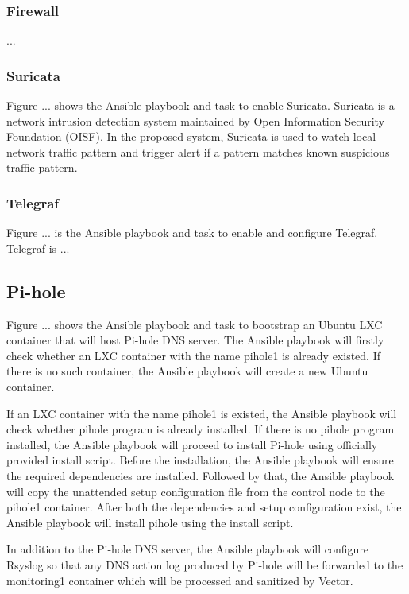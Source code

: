 \documentclass[../index.tex]{subfiles}
\begin{document}
\subsubsection{Firewall}

...

\subsubsection{Suricata}

Figure ... shows the Ansible playbook and task to enable Suricata. Suricata is a network intrusion
detection system maintained by Open Information Security Foundation (OISF). In the proposed system,
Suricata is used to watch local network traffic pattern and trigger alert if a pattern matches known
suspicious traffic pattern.

\subsubsection{Telegraf}

Figure ... is the Ansible playbook and task to enable and configure Telegraf. Telegraf is ...

\subsection{Pi-hole}

Figure ... shows the Ansible playbook and task to bootstrap an Ubuntu LXC container that will host
Pi-hole DNS server. The Ansible playbook will firstly check whether an LXC container with the name
pihole1 is already existed. If there is no such container, the Ansible playbook will create a new
Ubuntu container.

If an LXC container with the name pihole1 is existed, the Ansible playbook will check whether pihole
program is already installed. If there is no pihole program installed, the Ansible playbook will
proceed to install Pi-hole using officially provided install script. Before the installation, the
Ansible playbook will ensure the required dependencies are installed. Followed by that, the Ansible
playbook will copy the unattended setup configuration file from the control node to the pihole1
container. After both the dependencies and setup configuration exist, the Ansible playbook will
install pihole using the install script.

In addition to the Pi-hole DNS server, the Ansible playbook will configure Rsyslog so that any DNS
action log produced by Pi-hole will be forwarded to the monitoring1 container which will be
processed and sanitized by Vector.
\end{document}
